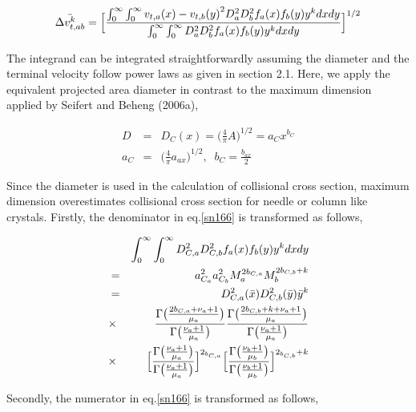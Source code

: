 \begin{eqnarray}
\bar{\Delta v_{t,ab}^{k}}=\Bigl[\frac{\int_{0}^{\infty}\int_{0}^{\infty}{v_{t,a}(x)-v_{t,b}(y)}^{2}D_{a}^{2}D_{b}^{2}f_{a}(x)f_{b}(y)y^{k}dxdy}
{\int_{0}^{\infty}\int_{0}^{\infty}D_{a}^{2}D_{b}^{2}f_{a}(x)f_{b}(y)y^{k}dxdy}\Bigr]^{1/2}\label{sn166}
\end{eqnarray}

The integrand can be integrated straightforwardly assuming the diameter and the terminal velocity follow power laws as given in section 2.1. Here, we apply the equivalent projected area diameter in contrast to the maximum dimension applied by Seifert and Beheng (2006a),

\begin{eqnarray}
D&=&D_{C}(x)=\bigl(\frac{4}{\pi}A\bigr)^{1/2}=a_{C}x^{b_{C}}\label{sn167}\\
a_{C}&=&\bigl(\frac{4}{\pi}a_{ax}\bigr)^{1/2},\;\;b_{C}=\frac{b_{ax}}{2}\nonumber
\end{eqnarray}

Since the diameter is used in the calculation of collisional cross section, maximum dimension overestimates collisional cross section for needle or column like crystals. Firstly, the denominator in eq.\ref{sn166} is transformed as follows,

\begin{eqnarray}
& &\int_{0}^{\infty}\int_{0}^{\infty}D_{C,a}^{2}D_{C,b}^{2}f_{a}(x)f_{b}(y)y^{k}dxdy\nonumber\\
&=&a_{C_{a}}^{2}a_{C_{b}}^{2}M_{a}^{2b_{C,a}}M_{b}^{2b_{C,b}+k}\nonumber\\
&=&D_{C,a}^{2}(\bar{x})D_{C,b}^{2}(\bar{y})\bar{y}^{k}\nonumber\\
&\times&\frac{\Gamma\bigl(\frac{2b_{C,a}+\nu_{a}+1}{\mu_{a}}\bigr)}{\Gamma\bigl(\frac{\nu_{a}+1}{\mu_{a}}\bigr)}
\frac{\Gamma\bigl(\frac{2b_{C,b}+k+\nu_{a}+1}{\mu_{a}}\bigr)}{\Gamma\bigl(\frac{\nu_{a}+1}{\mu_{a}}\bigr)}\nonumber\\
&\times&\Bigl[\frac{\Gamma\bigl(\frac{\nu_{a}+1}{\mu_{a}}\bigr)}{\Gamma\bigl(\frac{\nu_{a}+1}{\mu_{a}}\bigr)}\Bigl]^{2_{b_{C,a}}}
\Bigl[\frac{\Gamma\bigl(\frac{\nu_{b}+1}{\mu_{b}}\bigr)}{\Gamma\bigl(\frac{\nu_{b}+1}{\mu_{b}}\bigr)}\Bigl]^{2_{b_{C,b}}+k}\label{sn168}
\end{eqnarray}

Secondly, the numerator in eq.\ref{sn166} is transformed as follows,


